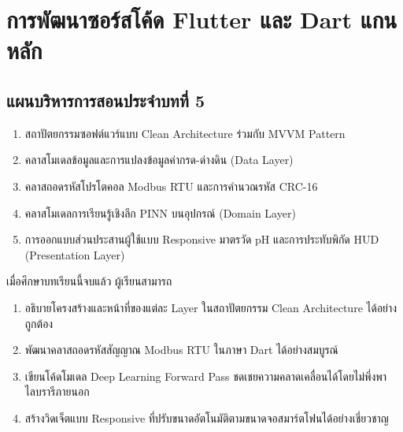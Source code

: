 \chapter{การพัฒนาซอร์สโค้ด Flutter และ Dart แกนหลัก}
\label{chap:ch05}

\section*{แผนบริหารการสอนประจำบทที่ 5}

\begin{tcolorbox}[
    enhanced, breakable,
    colback=white, colframe=rbruNavy,
    fonttitle=\bfseries\color{white},
    title={1. หัวข้อเนื้อหาประจำบท},
    arc=1.5mm, boxrule=0.8pt, leftrule=3.5mm
]
\begin{enumerate}
    \item สถาปัตยกรรมซอฟต์แวร์แบบ Clean Architecture ร่วมกับ MVVM Pattern
    \item คลาสโมเดลข้อมูลและการแปลงข้อมูลค่ากรด-ด่างดิน (Data Layer)
    \item คลาสถอดรหัสโปรโตคอล Modbus RTU และการคำนวณรหัส CRC-16
    \item คลาสโมเดลการเรียนรู้เชิงลึก PINN บนอุปกรณ์ (Domain Layer)
    \item การออกแบบส่วนประสานผู้ใช้แบบ Responsive มาตรวัด pH และการประทับพิกัด HUD (Presentation Layer)
\end{enumerate}
\end{tcolorbox}

\begin{tcolorbox}[
    enhanced, breakable,
    colback=white, colframe=rbruNavy,
    fonttitle=\bfseries\color{white},
    title={2. วัตถุประสงค์เชิงพฤติกรรม},
    arc=1.5mm, boxrule=0.8pt, leftrule=3.5mm
]
เมื่อศึกษาบทเรียนนี้จบแล้ว ผู้เรียนสามารถ
\begin{enumerate}
    \item อธิบายโครงสร้างและหน้าที่ของแต่ละ Layer ในสถาปัตยกรรม Clean Architecture ได้อย่างถูกต้อง
    \item พัฒนาคลาสถอดรหัสสัญญาณ Modbus RTU ในภาษา Dart ได้อย่างสมบูรณ์
    \item เขียนโค้ดโมเดล Deep Learning Forward Pass ชดเชยความคลาดเคลื่อนได้โดยไม่พึ่งพาไลบรารีภายนอก
    \item สร้างวิดเจ็ตแบบ Responsive ที่ปรับขนาดอัตโนมัติตามขนาดจอสมาร์ตโฟนได้อย่างเชี่ยวชาญ
\end{enumerate}
\end{tcolorbox}

